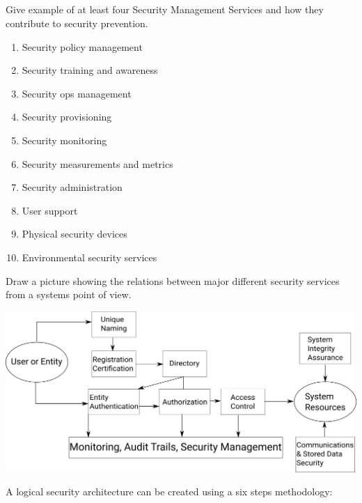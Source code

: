 \begin{questions}
\begin{parts}
  \part{} Give example of at least four Security Management Services and how they contribute to security prevention.
    \begin{solution}
      \begin{enumerate}[noitemsep]
      \item Security policy management
      \item Security training and awareness
      \item Security ops management
      \item Security provisioning
      \item Security monitoring
      \item Security measurements and metrics
      \item Security administration
      \item User support
      \item Physical security devices
      \item Environmental security services
      \end{enumerate}
    \end{solution}
  \end{parts}

\question{} Draw a picture showing the relations between major different security services from a systems point of view.
  \begin{solution}
    \includegraphics[scale=0.5]{./Drawings/EITP20-Secure_Systems_Engineering/Major_Security_Services_Relations.png}
  \end{solution}

\question{} A logical security architecture can be created using a six steps methodology:
  \begin{parts}

\end{parts}
\end{questions}
